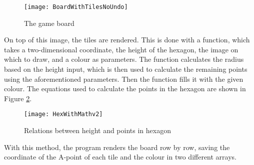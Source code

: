 \begin{figure}[!h]
\centering \texttt{[image: BoardWithTilesNoUndo]}
\caption{The game board \label{Fig:Board}}
\end{figure}

On top of this image, the tiles are rendered. This is done with a function, which takes a two-dimensional coordinate, the height of the hexagon, the image on which to draw, and a colour as parameters. The function calculates the radius based on the height input, which is then used to calculate the remaining points using the aforementioned parameters. Then the function fills it with the given colour. The equations used to calculate the points in the hexagon are shown in Figure \ref{Fig:HexWithMath}.

\begin{figure}[!h]
\centering \texttt{[image: HexWithMathv2]}
\caption{Relations between height and points in hexagon \label{Fig:HexWithMath}}
\end{figure}

With this method, the program renders the board row by row, saving the coordinate of the A-point of each tile and the colour in two different arrays.